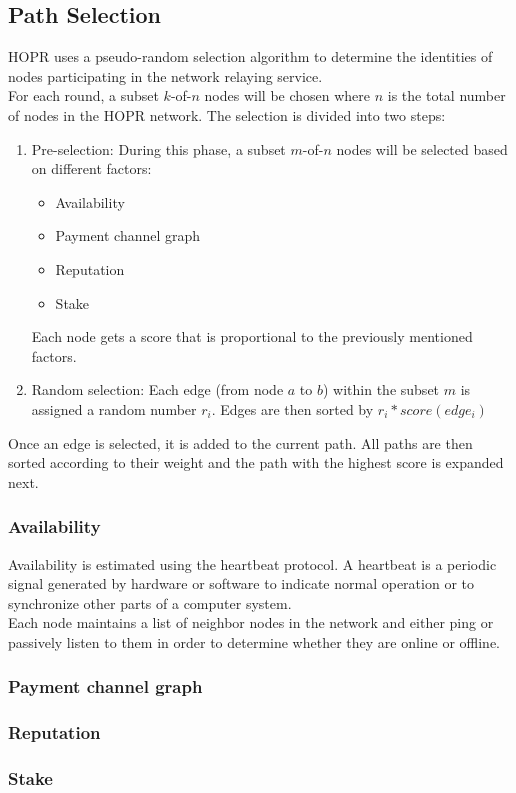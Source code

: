 \subsection{Path Selection}
HOPR uses a pseudo-random selection algorithm to determine the identities of nodes participating in the network relaying service.
\\For each round, a subset $k$-of-$n$ nodes will be chosen where $n$ is the total number of nodes in the HOPR network. The selection is divided into two steps:
\begin{enumerate}
    \item Pre-selection: 
    During this phase, a subset $m$-of-$n$ nodes will be selected based on different factors:
    \begin{itemize}
        \item Availability
        \item Payment channel graph
        \item Reputation
        \item Stake
    \end{itemize}
Each node gets a score that is proportional to the previously mentioned factors.
\item Random selection: 
Each edge (from node $a$ to $b$) within the subset $m$ is assigned a random number $r_i$. Edges are then sorted by $r_i*score(edge_i)$
\end{enumerate}
Once an edge is selected, it is added to the current path. All paths are then sorted according to their weight and the path with the highest score is expanded next.


\subsubsection{Availability}
Availability is estimated using the heartbeat protocol. A heartbeat is a periodic signal generated by hardware or software to indicate normal operation or to synchronize other parts of a computer system.
\\ Each node maintains a list of neighbor nodes in the network and either ping or passively listen to them in order to determine whether they are online or offline.

\subsubsection{Payment channel graph}
\subsubsection{Reputation}
\subsubsection{Stake}











    
